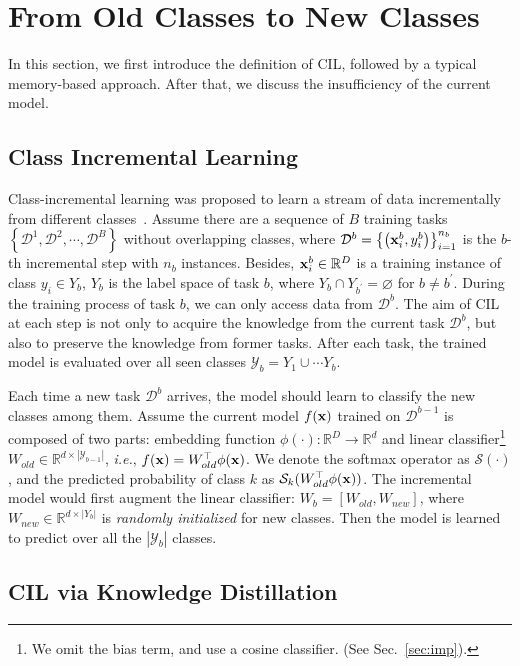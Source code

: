 \documentclass[sigconf]{acmart}
\newcommand{\x}{{\bf x}}
\newcommand{\D}{\mathcal{D}}
\newcommand{\R}{\mathbb{R}}
\newcommand{\ie}{\emph{i.e.}}
\begin{document}
\section{From Old Classes to New Classes}
In this section, we first introduce the definition of CIL, followed by a typical memory-based approach.
After that, we discuss the insufficiency of the current model.
\subsection{Class Incremental Learning}
Class-incremental learning was proposed to learn a stream of data incrementally from different classes~\cite{rebuffi2017icarl}. Assume there are a sequence of $B$  training tasks $\left\{\D^{1}, \D^{2}, \cdots, \D^{B}\right\}$ without overlapping classes, where $\D^{b}=\left\{\left(\x_{i}^{b}, y_{i}^{b}\right)\right\}_{i=1}^{n_b}$ is the $b$-th incremental step with $n_b$ instances. Besides,  $\x_i^b \in \R^D$ is a training instance of class $y_i \in Y_b$, $Y_b$ is the label space of task $b$, where
$Y_b  \cap Y_{b^\prime} = \varnothing$ for $b\neq b^\prime$. 
During the training process of task $b$, we can only access data from $\D^b$.  
The aim of CIL at each step is not only to acquire the knowledge from the current task  $\D^b$, but also to preserve the knowledge from former tasks. 
After each task, the trained model is evaluated over all seen classes $\mathcal{Y}_b=Y_1 \cup \cdots Y_b$.

Each time a new task $\D^b$ arrives, the model should learn to classify the new classes among them. Assume the current model $f(\x)$ trained on $\D^{b-1}$  is composed of two parts: embedding  function $\phi(\cdot):\mathbb{R}^{D} \rightarrow \mathbb{R}^{d}$ and linear classifier\footnote{We omit the bias term, and use a cosine classifier. (See Sec.~\ref{sec:imp}).} $W_{old}\in\mathbb{R}^{d\times |\mathcal{Y}_{b-1}|}$, \ie, $f(\x)=W_{old}^{\top}\phi(\x)$. 
We denote the softmax operator as $\mathcal{S}(\cdot)$, and the predicted probability of class $k$ as $\mathcal{S}_k(W_{old}^{\top}\phi(\x))$.
The incremental model would first augment the linear classifier: $W_b=[W_{old}, W_{new}]$, where $W_{new}\in\mathbb{R}^{d\times |Y_b|}$ is \emph{randomly initialized} for new classes. Then the model is learned to predict over all the $|\mathcal{Y}_b|$ classes.

\subsection{CIL via Knowledge Distillation}
\end{document}
